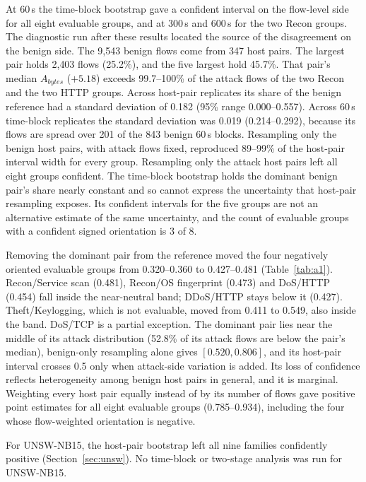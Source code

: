 \documentclass[preprint,12pt]{elsarticle}
\begin{document}
At 60\,s the time-block bootstrap gave a confident interval on the flow-level side for all eight evaluable groups, and at 300\,s and 600\,s for the two Recon groups. The diagnostic run after these results located the source of the disagreement on the benign side. The 9{,}543 benign flows come from 347 host pairs. The largest pair holds 2{,}403 flows (25.2\%), and the five largest hold 45.7\%. That pair's median $A_{bytes}$ ($+5.18$) exceeds 99.7--100\% of the attack flows of the two Recon and the two HTTP groups. Across host-pair replicates its share of the benign reference had a standard deviation of 0.182 (95\% range 0.000--0.557). Across 60\,s time-block replicates the standard deviation was 0.019 (0.214--0.292), because its flows are spread over 201 of the 843 benign 60\,s blocks. Resampling only the benign host pairs, with attack flows fixed, reproduced 89--99\% of the host-pair interval width for every group. Resampling only the attack host pairs left all eight groups confident. The time-block bootstrap holds the dominant benign pair's share nearly constant and so cannot express the uncertainty that host-pair resampling exposes. Its confident intervals for the five groups are not an alternative estimate of the same uncertainty, and the count of evaluable groups with a confident signed orientation is 3 of 8.

Removing the dominant pair from the reference moved the four negatively oriented evaluable groups from 0.320--0.360 to 0.427--0.481 (Table~\ref{tab:a1}). Recon/Service scan (0.481), Recon/OS fingerprint (0.473) and DoS/HTTP (0.454) fall inside the near-neutral band; DDoS/HTTP stays below it (0.427). Theft/Keylogging, which is not evaluable, moved from 0.411 to 0.549, also inside the band. DoS/TCP is a partial exception. The dominant pair lies near the middle of its attack distribution (52.8\% of its attack flows are below the pair's median), benign-only resampling alone gives $[0.520, 0.806]$, and its host-pair interval crosses 0.5 only when attack-side variation is added. Its loss of confidence reflects heterogeneity among benign host pairs in general, and it is marginal. Weighting every host pair equally instead of by its number of flows gave positive point estimates for all eight evaluable groups (0.785--0.934), including the four whose flow-weighted orientation is negative.

For UNSW-NB15, the host-pair bootstrap left all nine families confidently positive (Section~\ref{sec:unsw}). No time-block or two-stage analysis was run for UNSW-NB15.
\end{document}
